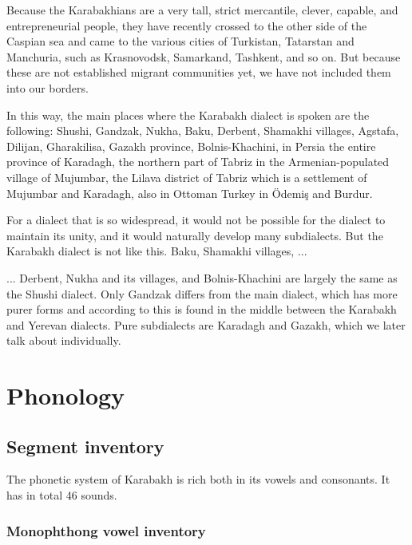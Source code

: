 Because the Karabakhians are a very tall, strict mercantile, clever, capable, and entrepreneurial people, they have recently crossed to the other side of the Caspian sea and came to the various cities of Turkistan, Tatarstan and Manchuria, such as Krasnovodsk, Samarkand, Tashkent, and so on. But because these are not established migrant communities yet, we have not included them into our borders. 

In this way, the main places where the Karabakh dialect is spoken are the following: Shushi, Gandzak, Nukha, Baku, Derbent, Shamakhi villages, Agstafa, Dilijan, Gharakilisa, Gazakh province, Bolnis-Khachini, in Persia the entire province of Karadagh, the northern part of Tabriz in the Armenian-populated village of Mujumbar, the Lilava district of Tabriz which is a settlement of Mujumbar and Karadagh, also in Ottoman Turkey in Ödemiş and Burdur. 

For a dialect that is so widespread, it would not be possible for the dialect to maintain its unity, and it would naturally develop many subdialects. But the Karabakh dialect is not like this. Baku, Shamakhi villages, ... 

\begin{adjarianpage}\label{page:62}\end{adjarianpage}%

... Derbent, Nukha and its villages, and Bolnis-Khachini are largely the same as the Shushi dialect. Only Gandzak differs from the main dialect, which has more purer forms and according to this is found in the middle between the Karabakh and Yerevan dialects. Pure subdialects are Karadagh and Gazakh, which we later talk about individually.

\section{Phonology}
\subsection{Segment inventory}

The phonetic system of Karabakh is rich both in its vowels and consonants. It has in total 46 sounds. 
\subsubsection{Monophthong vowel inventory}

